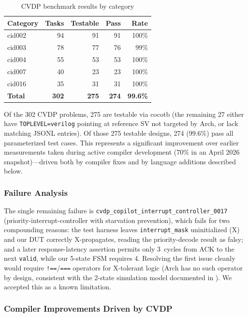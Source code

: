 \documentclass[11pt,twocolumn]{article}
\begin{document}
\begin{table}[t]
\centering
\caption{CVDP benchmark results by category}
\label{tab:cvdp}
\footnotesize
\begin{tabular}{@{}lrrrr@{}}
\toprule
\textbf{Category} & \textbf{Tasks} & \textbf{Testable} & \textbf{Pass} & \textbf{Rate} \\
\midrule
cid002 & 94 & 91 & 91 & 100\% \\
cid003 & 78 & 77 & 76 & 99\% \\
cid004 & 55 & 53 & 53 & 100\% \\
cid007 & 40 & 23 & 23 & 100\% \\
cid016 & 35 & 31 & 31 & 100\% \\
\midrule
\textbf{Total} & \textbf{302} & \textbf{275} & \textbf{274} & \textbf{99.6\%} \\
\bottomrule
\end{tabular}
\end{table}

Of the 302 CVDP problems, 275 are testable via cocotb (the remaining 27 either have \texttt{TOPLEVEL=verilog} pointing at reference SV not targeted by Arch, or lack matching JSONL entries). Of those 275 testable designs, 274 (99.6\%) pass all parameterized test cases. This represents a significant improvement over earlier measurements taken during active compiler development (70\% in an April 2026 snapshot)---driven both by compiler fixes and by language additions described below.

\subsubsection{Failure Analysis}

The single remaining failure is \texttt{cvdp\_copilot\_interrupt\_controller\_0017} (priority-interrupt-controller with starvation prevention), which fails for two compounding reasons: the test harness leaves \texttt{interrupt\_mask} uninitialized (X) and our DUT correctly X-propagates, reading the priority-decode result as falsy; and a later response-latency assertion permits only 3~cycles from ACK to the next \texttt{valid}, while our 5-state FSM requires 4. Resolving the first issue cleanly would require \texttt{!==}/\texttt{===} operators for X-tolerant logic (Arch has no such operator by design, consistent with the 2-state simulation model documented in ). We accepted this as a known limitation.

\subsubsection{Compiler Improvements Driven by CVDP}
\end{document}
